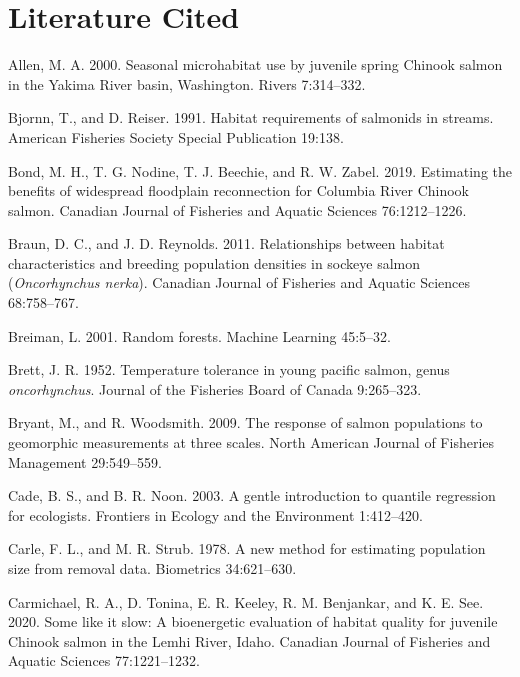 \documentclass[
  12pt,
]{article}
\begin{document}
\newpage

\hypertarget{literature-cited}{%
\section{Literature Cited}\label{literature-cited}}

\hypertarget{refs}{}
\leavevmode\hypertarget{ref-Allen2000}{}%
Allen, M. A. 2000. Seasonal microhabitat use by juvenile spring Chinook salmon in the Yakima River basin, Washington. Rivers 7:314--332.

\leavevmode\hypertarget{ref-Bjornn1991}{}%
Bjornn, T., and D. Reiser. 1991. Habitat requirements of salmonids in streams. American Fisheries Society Special Publication 19:138.

\leavevmode\hypertarget{ref-Bond2019}{}%
Bond, M. H., T. G. Nodine, T. J. Beechie, and R. W. Zabel. 2019. Estimating the benefits of widespread floodplain reconnection for Columbia River Chinook salmon. Canadian Journal of Fisheries and Aquatic Sciences 76:1212--1226.

\leavevmode\hypertarget{ref-Braun2011}{}%
Braun, D. C., and J. D. Reynolds. 2011. Relationships between habitat characteristics and breeding population densities in sockeye salmon (\emph{Oncorhynchus nerka}). Canadian Journal of Fisheries and Aquatic Sciences 68:758--767.

\leavevmode\hypertarget{ref-Breiman2001}{}%
Breiman, L. 2001. Random forests. Machine Learning 45:5--32.

\leavevmode\hypertarget{ref-Brett1952}{}%
Brett, J. R. 1952. Temperature tolerance in young pacific salmon, genus \emph{oncorhynchus}. Journal of the Fisheries Board of Canada 9:265--323.

\leavevmode\hypertarget{ref-Bryant2009}{}%
Bryant, M., and R. Woodsmith. 2009. The response of salmon populations to geomorphic measurements at three scales. North American Journal of Fisheries Management 29:549--559.

\leavevmode\hypertarget{ref-Cade2003}{}%
Cade, B. S., and B. R. Noon. 2003. A gentle introduction to quantile regression for ecologists. Frontiers in Ecology and the Environment 1:412--420.

\leavevmode\hypertarget{ref-Carle1978}{}%
Carle, F. L., and M. R. Strub. 1978. A new method for estimating population size from removal data. Biometrics 34:621--630.

\leavevmode\hypertarget{ref-Carmichael2020}{}%
Carmichael, R. A., D. Tonina, E. R. Keeley, R. M. Benjankar, and K. E. See. 2020. Some like it slow: A bioenergetic evaluation of habitat quality for juvenile Chinook salmon in the Lemhi River, Idaho. Canadian Journal of Fisheries and Aquatic Sciences 77:1221--1232.
\end{document}
